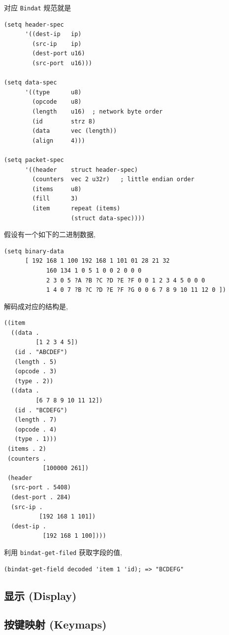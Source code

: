 \documentclass[11pt]{article}
\begin{document}
\begin{enumerate}
对应 \texttt{Bindat} 规范就是

\begin{verbatim}
(setq header-spec
      '((dest-ip   ip)
        (src-ip    ip)
        (dest-port u16)
        (src-port  u16)))

(setq data-spec
      '((type      u8)
        (opcode    u8)
        (length    u16)  ; network byte order
        (id        strz 8)
        (data      vec (length))
        (align     4)))

(setq packet-spec
      '((header    struct header-spec)
        (counters  vec 2 u32r)   ; little endian order
        (items     u8)
        (fill      3)
        (item      repeat (items)
                   (struct data-spec))))
\end{verbatim}

假设有一个如下的二进制数据,

\begin{verbatim}
(setq binary-data
      [ 192 168 1 100 192 168 1 101 01 28 21 32
            160 134 1 0 5 1 0 0 2 0 0 0
            2 3 0 5 ?A ?B ?C ?D ?E ?F 0 0 1 2 3 4 5 0 0 0
            1 4 0 7 ?B ?C ?D ?E ?F ?G 0 0 6 7 8 9 10 11 12 0 ])
\end{verbatim}

解码成对应的结构是,

\begin{verbatim}
((item
  ((data .
         [1 2 3 4 5])
   (id . "ABCDEF")
   (length . 5)
   (opcode . 3)
   (type . 2))
  ((data .
         [6 7 8 9 10 11 12])
   (id . "BCDEFG")
   (length . 7)
   (opcode . 4)
   (type . 1)))
 (items . 2)
 (counters .
           [100000 261])
 (header
  (src-port . 5408)
  (dest-port . 284)
  (src-ip .
          [192 168 1 101])
  (dest-ip .
           [192 168 1 100])))
\end{verbatim}

利用 \texttt{bindat-get-filed} 获取字段的值,

\begin{verbatim}
(bindat-get-field decoded 'item 1 'id); => "BCDEFG"
\end{verbatim}
\end{enumerate}




\subsection{显示 (Display)}
\label{sec:org7cf632c}


\subsection{按键映射 (Keymaps)}
\label{sec:orge6252cb}
\end{document}
